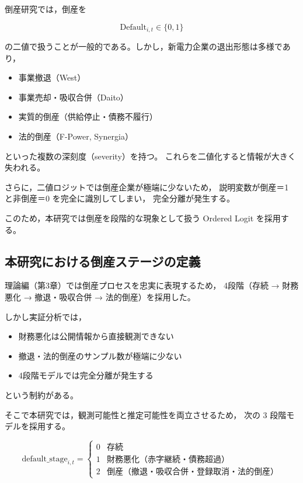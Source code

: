 倒産研究では，倒産を



\[
\text{Default}_{i,t} \in \{0,1\}
\]



の二値で扱うことが一般的である。しかし，新電力企業の退出形態は多様であり，

\begin{itemize}
    \item 事業撤退（West）
    \item 事業売却・吸収合併（Daito）
    \item 実質的倒産（供給停止・債務不履行）
    \item 法的倒産（F-Power, Synergia）
\end{itemize}

といった複数の深刻度（severity）を持つ。
これらを二値化すると情報が大きく失われる。

さらに，二値ロジットでは倒産企業が極端に少ないため，
説明変数が倒産＝1 と非倒産＝0 を完全に識別してしまい，
完全分離が発生する。

このため，本研究では倒産を段階的な現象として扱う Ordered Logit を採用する。

\subsection{本研究における倒産ステージの定義}

理論編（第3章）では倒産プロセスを忠実に表現するため，
4段階（存続 → 財務悪化 → 撤退・吸収合併 → 法的倒産）を採用した。

しかし実証分析では，

\begin{itemize}
    \item 財務悪化は公開情報から直接観測できない
    \item 撤退・法的倒産のサンプル数が極端に少ない
    \item 4段階モデルでは完全分離が発生する
\end{itemize}

という制約がある。

そこで本研究では，観測可能性と推定可能性を両立させるため，
次の 3 段階モデルを採用する。



\[
\text{default\_stage}_{i,t} =
\begin{cases}
0 & \text{存続} \\
1 & \text{財務悪化（赤字継続・債務超過）} \\
2 & \text{倒産（撤退・吸収合併・登録取消・法的倒産）}
\end{cases}
\]



